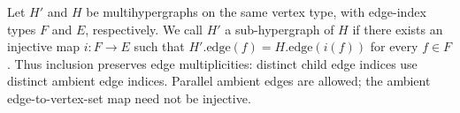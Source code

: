 \begin{definition}
Let $H'$ and $H$ be multihypergraphs on the same vertex type, with edge-index
types $F$ and $E$, respectively. We call $H'$ a sub-hypergraph of $H$ if
there exists an injective map $i:F\to E$ such that
$H'.\mathrm{edge}(f)=H.\mathrm{edge}(i(f))$ for every $f\in F$.
Thus inclusion preserves edge multiplicities: distinct child edge indices
use distinct ambient edge indices. Parallel ambient edges are allowed;
the ambient edge-to-vertex-set map need not be injective.
\end{definition}

